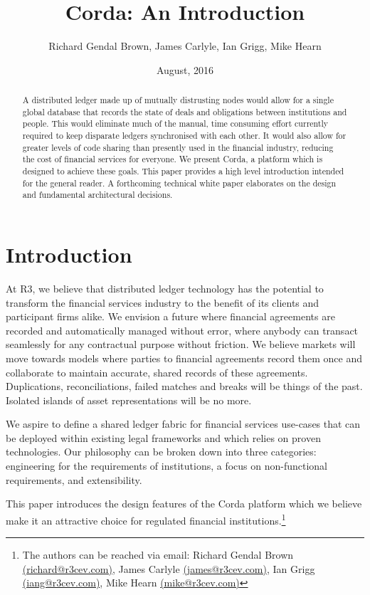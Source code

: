 \documentclass{article}
\author{Richard Gendal Brown, James Carlyle, Ian Grigg, Mike Hearn}
\date{August, 2016}
\title{Corda: An Introduction}
\begin{document}
\maketitle 

\begin{abstract}

A distributed ledger made up of mutually distrusting nodes would allow for a single global database that records the state of deals and obligations between institutions and people. This would eliminate much of the manual, time consuming effort currently required to keep disparate ledgers synchronised with each other. It would also allow for greater levels of code sharing than presently used in the financial industry, reducing the cost of financial services for everyone. We present Corda, a platform which is designed to achieve these goals. This paper provides a high level introduction intended for the general reader. A forthcoming technical white paper elaborates on the design and fundamental architectural decisions.
\end{abstract}
\newpage
\tableofcontents
\newpage
\section{Introduction}
At R3, we believe that distributed ledger technology has the potential to transform the financial services industry to the benefit of its clients and participant firms alike. We envision a future where financial agreements are recorded and automatically managed without error, where anybody can transact seamlessly for any contractual purpose without friction. We believe markets will move towards models where parties to financial agreements record them once and collaborate to maintain accurate, shared records of these agreements. Duplications, reconciliations, failed matches and breaks will be things of the past. Isolated islands of asset representations will be no more.

We aspire to define a shared ledger fabric for financial services use-cases that can be deployed within existing legal frameworks and which relies on proven technologies. Our philosophy can be broken down into three categories: engineering for the requirements of institutions, a focus on non-functional requirements, and extensibility.

This paper introduces the design features of the Corda platform which we believe make it an attractive choice for regulated financial institutions.\footnote{The authors can be reached via email: Richard Gendal Brown \href{mailto:richard@r3cev.com}{(richard@r3cev.com)}, James Carlyle \href{mailto:james@r3cev.com}{(james@r3cev.com)}, Ian Grigg \href{mailto:iang@r3cev.com}{(iang@r3cev.com)}, Mike Hearn \href{mailto:mike@r3cev.com}{(mike@r3cev.com)}}
\end{document}
